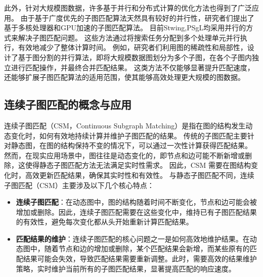 此外，针对大规模图数据，许多基于并行和分布式计算的优化方法也得到了广泛应用。
由于基于广度优先的子图匹配算法天然具有较好的并行性，研究者们提出了基于多核处理器和GPU加速的子图匹配算法。
目前Stwing\cite{sm-stwing-DBLP:journals/pvldb/SunWWSL12},PSgL\cite{sm-psgl-DBLP:conf/sigmod/ShaoCCMYX14}均采用并行的方式来解决子图匹配问题。
这些方法通过将搜索任务分配到多个处理单元并行执行，有效地减少了整体计算时间。
例如，研究者们利用图的稀疏性和局部性，设计了基于图分割的并行算法，即将大规模数据图划分为多个子图，在各个子图内独立进行匹配操作，并最终合并匹配结果。
这类方法不仅能够显著提升匹配速度，还能够扩展子图匹配算法的适用范围，使其能够高效处理更大规模的图数据。


\subsection{连续子图匹配的概念与应用}
连续子图匹配（CSM，Continuous Subgraph Matching）是指在图的结构发生动态变化时，如何有效地持续计算并维护子图匹配的结果。
传统的子图匹配主要针对静态图，在图的结构保持不变的情况下，可以通过一次性计算获得匹配结果。
然而，在现实应用场景中，图往往是动态变化的，即节点和边可能不断新增或删除，这使得静态子图匹配方法无法满足实时性需求。
因此，CSM 需要在图结构变化时，高效更新匹配结果，确保其实时性和有效性。
与静态子图匹配不同，连续子图匹配（CSM）主要涉及以下几个核心特点：
\begin{itemize}
   \item \textbf{连续子图匹配}：在动态图中，图的结构随着时间不断变化，节点和边可能会被增加或删除。因此，连续子图匹配需要在这些变化中，维持已有子图匹配结果的有效性，避免每次变化都从头开始重新计算匹配结果。
   \item \textbf{匹配结果的维护}：连续子图匹配的核心问题之一是如何高效地维护结果。在动态图中，随着节点和边的增加或删除，某个匹配结果会新增，而某些原有的匹配结果可能会失效，导致匹配结果需要重新调整。此时，需要高效的结果维护策略，实时维护当前所有的子图匹配结果，显著提高匹配的响应速度。
\end{itemize}

